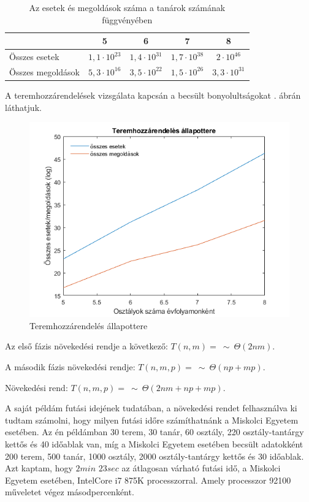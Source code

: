 \begin{table}[h!]
	\centering
	\caption{Az esetek és megoldások száma a tanárok számának függvényében}
	\label{tab:complexity3}
	\medskip
\begin{tabular}{|l|c|c|c|c|}
\hline
& 5 & 6 & 7 & 8 \\
\hline
Összes esetek & $1,1 \cdot 10^{23}$ & $1,4 \cdot 10^{31}$ & $1,7 \cdot 10^{38}$ & $2 \cdot 10^{46}$ \\ 
\hline
Összes megoldások & $5,3 \cdot 10^{16}$ & $3,5 \cdot 10^{22}$ & $1,5 \cdot 10^{26}$ & $3,3 \cdot 10^{31}$ \\
\hline
\end{tabular}
\end{table}

A teremhozzárendelések vizsgálata kapcsán a becsült bonyolultságokat . ábrán láthatjuk.

\begin{figure}[h!]
	\includegraphics[width=\linewidth]{images/teremhozzarendeles.png}
	\caption{Teremhozzárendelés állapottere}
	\label{fig:teremhozzarendeles}
\end{figure}

Az első fázis növekedési rendje a következő: $T(n,m)=\ \sim \ \Theta (2nm).$

A második fázis növekedési rendje: $T(n,m,p)=\ \sim \ \Theta (np+mp).$

Növekedési rend: $T(n,m,p)=\ \sim \ \Theta (2nm+np+mp).$

A saját példám futási idejének tudatában, a növekedési rendet felhasználva ki tudtam számolni, hogy milyen futási időre számíthatnánk a Miskolci Egyetem esetében. Az én példámban 30 terem, 30 tanár, 60 osztály, 220 osztály-tantárgy kettős és 40 időablak van, míg a Miskolci Egyetem esetében becsült adatokként 200 terem, 500 tanár, 1000 osztály, 2000 osztály-tantárgy kettős és 30 időablak. Azt kaptam, hogy $2min$ $23sec$ az átlagosan várható futási idő, a Miskolci Egyetem esetében, IntelCore i7 875K processzorral. Amely processzor 92100 műveletet végez másodpercenként.

